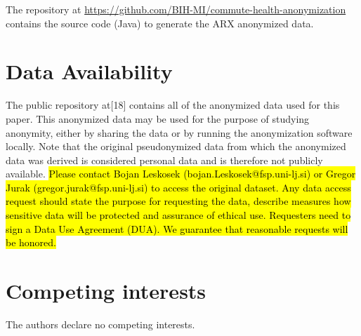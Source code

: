 \documentclass[10pt]{article}
\newcommand{\mycite}[1]{[#1]}
\begin{document}
The repository at {\small \url{https://github.com/BIH-MI/commute-health-anonymization}} contains the source code (Java) to generate the ARX anonymized data.

\section*{Data Availability}

The public repository at\mycite{18} contains all of the anonymized data used for this paper. This anonymized data may be used for the purpose of studying anonymity, either by sharing the data or by running the anonymization software locally. Note that the original pseudonymized data from which the anonymized data was derived is considered personal data and is therefore not publicly available.  \hl{Please contact Bojan Leskosek (bojan.Leskosek@fsp.uni-lj.si) or Gregor Jurak (gregor.jurak@fsp.uni-lj.si) to access the original dataset. Any data access request should state the purpose for requesting the data, describe measures how sensitive data will be protected and assurance of ethical use. Requesters need to sign a Data Use Agreement (DUA). We guarantee that reasonable requests will be honored. }

\section*{Competing interests}

The authors declare no competing interests.

%
\end{document}
